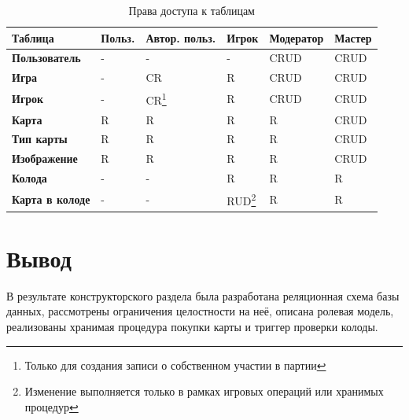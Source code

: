 \begin{longtable}{|p{}|p{}|p{}|p{}|p{}|p{}|}
    \caption{Права доступа к таблицам} \label{tbl:roles}
    \\
    \hline
    \textbf{Таблица} &
    \textbf{Польз.} &
    \textbf{Автор. польз.} &
    \textbf{Игрок} &
    \textbf{Модератор} &
    \textbf{Мастер} \\
    \hline
    \endfirsthead
    \textbf{Пользователь} & - & - & - & CRUD & CRUD \\ \hline

    \textbf{Игра} & - & CR & R & CRUD & CRUD \\ \hline

    \textbf{Игрок} & - & CR\footnote{\label{join} Только для создания записи о собственном участии в партии} & R & CRUD & CRUD \\ \hline

    \textbf{Карта} & R & R & R & R & CRUD \\ \hline

    \textbf{Тип карты} & R & R & R & R & CRUD \\ \hline

    \textbf{Изображение} & R & R & R & R & CRUD \\ \hline

    \textbf{Колода} & - & - & R & R & R \\ \hline

    \textbf{Карта в колоде} & - & - & RUD\footnote{\label{gameproc} Изменение выполняется только в рамках игровых операций или хранимых процедур} & R & R \\ \hline
\end{longtable}


\section{Вывод}
В результате конструкторского раздела была разработана реляционная схема базы данных, рассмотрены ограничения целостности на неё, описана ролевая модель, реализованы хранимая процедура покупки карты и триггер проверки колоды.